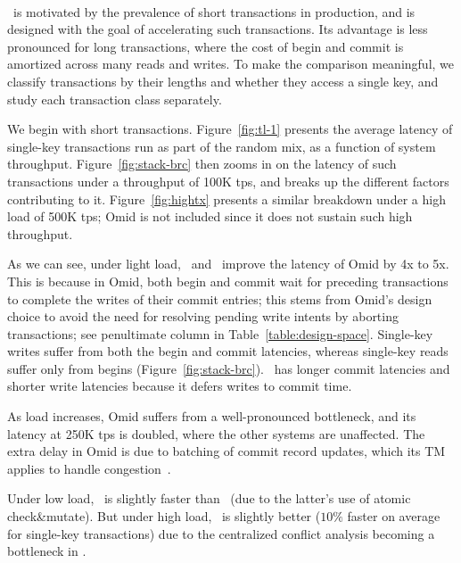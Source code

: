 %
\\ \sys\ is motivated by the prevalence of short transactions in production, and is designed with
the goal of accelerating such transactions.
Its advantage is less pronounced for long transactions, where the cost of begin and commit is amortized
across many reads and writes.
To make the comparison meaningful, we classify transactions by their lengths and whether they
access a single key, and study each transaction class separately. 

We begin with short transactions. 
Figure~\ref{fig:tl-1} presents the average latency of single-key transactions run as part of the random mix,
as a function of {system} throughput.
Figure~\ref{fig:stack-brc}  then zooms in on the latency of such transactions under 
a throughput of 100K tps, and breaks up the different factors contributing to it. 
Figure~\ref{fig:hightx}  presents a similar breakdown under a high load of 500K tps; Omid 
is not included since it does not sustain such high throughput.

As we can see, under light load, \sysll\ and \syspc\ improve the latency of Omid by 4x to 5x.
This is because in Omid, both begin and commit wait for preceding transactions to complete the writes of 
their commit entries; this stems from Omid's design choice to avoid the need for resolving pending write intents
by aborting transactions; see penultimate column in Table~\ref{table:design-space}. 
Single-key writes suffer from both the begin and commit latencies, whereas single-key reads  
suffer only from begins (Figure~\ref{fig:stack-brc}). \syspc\ has longer commit latencies and shorter write latencies
because it defers writes to commit time.

As load increases, Omid suffers from a well-pronounced bottleneck, and its latency at 250K tps is doubled, where the other systems
are unaffected. The extra delay in Omid is due to batching of commit record updates, 
which its TM applies to handle congestion~\cite{Omid2017}. 

Under low load, \sysll\ is slightly faster than \syspc\ (due to the latter's use of atomic check\&mutate). 
But under high load, \syspc\ is slightly better ($10\%$ faster on average for single-key transactions)   
due to the centralized conflict analysis becoming a bottleneck in \sysll.

